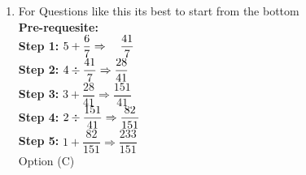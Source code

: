 \begin{multicols}{2}
\begin{enumerate}[label={\arabic*.}]
    \item For Questions like this its best to start from the bottom \\
    \textbf{Pre-requesite:} \\
     \textbf{Step 1:} \hspace{10px}\( 5 + \dfrac{6}{7} \Rightarrow \hspace{10px} \dfrac{41}{7}\) \vspace{5px} \\
     \textbf{Step 2:} \hspace{10px}\(4 \divisionsymbol \dfrac{41}{7} \Rightarrow \dfrac{28}{41}  \) \vspace{5px} \\
     \textbf{Step 3:} \hspace{10px}\(3 + \dfrac{28}{41} \Rightarrow \dfrac{151}{41}\) \vspace{5px}\\
     \textbf{Step 4:} \hspace{10px}$2 \divisionsymbol \dfrac{151}{41} \Rightarrow \dfrac{82}{151}$\\
     \textbf{Step 5:} \hspace{10px} \( 1 + \dfrac{82}{151} \Rightarrow \dfrac{233}{151}\) \\
    Option (C) 
    

\end{enumerate}
\end{multicols}
